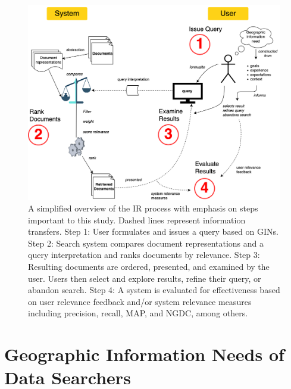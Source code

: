 \begin{figure}
    \centering
    \includegraphics[width=1\textwidth]{../figures/Background_IR_Steps.png}
    \caption{A simplified overview of the IR process with emphasis on steps important to this study. Dashed lines represent information transfers. Step 1: User formulates and issues a query based on GINs. Step 2: Search system compares document representations and a query interpretation and ranks documents by relevance. Step 3: Resulting documents are ordered, presented, and examined by the user. Users then select and explore results, refine their query, or abandon search. Step 4: A system is evaluated for effectiveness based on user relevance feedback and/or system relevance measures including \gls{precision}, \gls{recall}, \gls{MAP}, and \gls{NGDC}, among others.}
    \label{fig:Background_IR_Steps}
\end{figure}

\section{Geographic Information Needs of Data Searchers}

